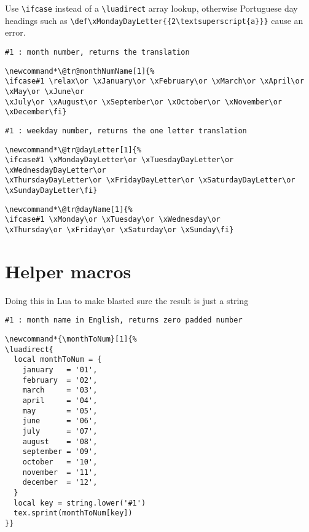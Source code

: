 \documentclass[11pt,oneside]{memoir-article}
\begin{document}
Use \texttt{\textbackslash{}ifcase} instead of a \texttt{\textbackslash{}luadirect} array lookup, otherwise Portuguese day
headings such as \texttt{\textbackslash{}def\textbackslash{}xMondayDayLetter\{\{2\textbackslash{}textsuperscript\{a\}\}\}} cause an error.

\begin{verbatim}
#1 : month number, returns the translation
\end{verbatim}

\begin{verbatim}
\newcommand*\@tr@monthNumName[1]{%
\ifcase#1 \relax\or \xJanuary\or \xFebruary\or \xMarch\or \xApril\or \xMay\or \xJune\or
\xJuly\or \xAugust\or \xSeptember\or \xOctober\or \xNovember\or \xDecember\fi}
\end{verbatim}

\begin{verbatim}
#1 : weekday number, returns the one letter translation 
\end{verbatim}

\begin{verbatim}
\newcommand*\@tr@dayLetter[1]{%
\ifcase#1 \xMondayDayLetter\or \xTuesdayDayLetter\or \xWednesdayDayLetter\or
\xThursdayDayLetter\or \xFridayDayLetter\or \xSaturdayDayLetter\or \xSundayDayLetter\fi}
\end{verbatim}

\begin{verbatim}
\newcommand*\@tr@dayName[1]{%
\ifcase#1 \xMonday\or \xTuesday\or \xWednesday\or
\xThursday\or \xFriday\or \xSaturday\or \xSunday\fi}
\end{verbatim}

\chapter{Helper macros}
\label{sec:org7ac4650}

Doing this in Lua to make blasted sure the result is just a string

\begin{verbatim}
#1 : month name in English, returns zero padded number
\end{verbatim}

\begin{verbatim}
\newcommand*{\monthToNum}[1]{%
\luadirect{
  local monthToNum = {
    january   = '01',
    february  = '02',
    march     = '03',
    april     = '04',
    may       = '05',
    june      = '06',
    july      = '07',
    august    = '08',
    september = '09',
    october   = '10',
    november  = '11',
    december  = '12',
  }
  local key = string.lower('#1')
  tex.sprint(monthToNum[key])
}}
\end{verbatim}
\end{document}
